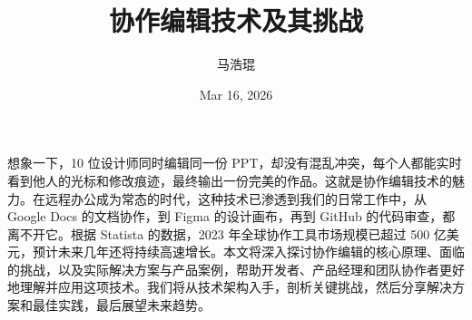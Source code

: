 \title{协作编辑技术及其挑战}
\author{马浩琨}
\date{Mar 16, 2026}
\maketitle
想象一下，10 位设计师同时编辑同一份 PPT，却没有混乱冲突，每个人都能实时看到他人的光标和修改痕迹，最终输出一份完美的作品。这就是协作编辑技术的魅力。在远程办公成为常态的时代，这种技术已渗透到我们的日常工作中，从 Google Docs 的文档协作，到 Figma 的设计画布，再到 GitHub 的代码审查，都离不开它。根据 Statista 的数据，2023 年全球协作工具市场规模已超过 500 亿美元，预计未来几年还将持续高速增长。本文将深入探讨协作编辑的核心原理、面临的挑战，以及实际解决方案与产品案例，帮助开发者、产品经理和团队协作者更好地理解并应用这项技术。我们将从技术架构入手，剖析关键挑战，然后分享解决方案和最佳实践，最后展望未来趋势。\par
